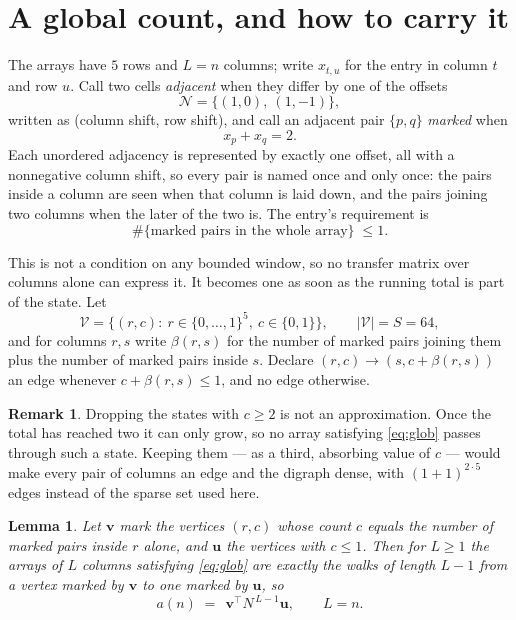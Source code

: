 \documentclass[11pt,a4paper]{article}
\theoremstyle{plain}
\newtheorem{lemma}[theorem]{Lemma}
\theoremstyle{definition}
\newtheorem{remark}[theorem]{Remark}
\begin{document}
\section{A global count, and how to carry it}

The arrays have $5$ rows and $L=n$ columns; write $x_{t,u}$ for the entry in
column $t$ and row $u$. Call two cells \emph{adjacent} when they differ by one of the
offsets
\[
\mathcal N=\{(1,0),\ (1,-1)\},
\]
written as (column shift, row shift), and call an adjacent pair $\{p,q\}$
\emph{marked} when
\[
x_{p}+x_{q}=2 .
\]
Each unordered adjacency is represented by exactly one offset, all with a nonnegative column
shift, so every pair is named once and only once: the pairs inside a column are seen when
that column is laid down, and the pairs joining two columns when the later of the two is. The
entry's requirement is
\begin{equation}\label{eq:glob}
\#\{\text{marked pairs in the whole array}\}\;\le1.
\end{equation}

This is not a condition on any bounded window, so no transfer matrix over columns alone can
express it. It becomes one as soon as the running total is part of the state. Let
\[
\mathcal V=\bigl\{(r,c):\ r\in\{0,\dots,1\}^{5},\ c\in\{0,1\}\bigr\},
\qquad |\mathcal V|=S=64,
\]
and for columns $r,s$ write $\beta(r,s)$ for the number of marked pairs joining them plus the
number of marked pairs inside $s$. Declare $(r,c)\to(s,c+\beta(r,s))$ an edge whenever
$c+\beta(r,s)\le1$, and no edge otherwise.

\begin{remark}
Dropping the states with $c\ge2$ is not an approximation. Once the total has reached two it
can only grow, so no array satisfying \eqref{eq:glob} passes through such a state. Keeping
them --- as a third, absorbing value of $c$ --- would make every pair of columns an edge and
the digraph dense, with $(1+1)^{2\cdot5}$ edges instead of the sparse set used here.
\end{remark}

\begin{lemma}\label{lem:walk}
Let $\mathbf{v}$ mark the vertices $(r,c)$ whose count $c$ equals the number of marked pairs
inside $r$ alone, and $\mathbf{u}$ the vertices with $c\le1$. Then for $L\ge1$ the arrays
of $L$ columns satisfying \eqref{eq:glob} are exactly the walks of length $L-1$ from a
vertex marked by $\mathbf{v}$ to one marked by $\mathbf{u}$, so
\[
a(n)\;=\;\,\mathbf{v}^{\!\top}N^{\,L-1}\mathbf{u},\qquad L=n .
\]
\end{lemma}
\end{document}
